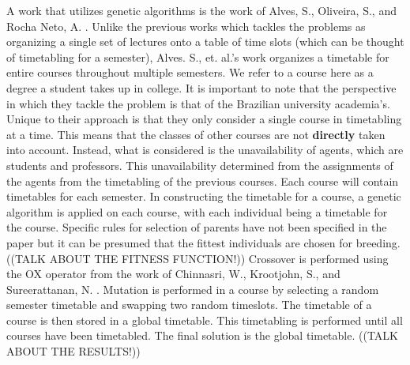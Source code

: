 A work that utilizes genetic algorithms is the work of Alves, S., Oliveira, S., and Rocha Neto, A. \cite{alves-novel-recursive}. Unlike the previous works which tackles the problems as organizing a single set of lectures onto a table of time slots (which can be thought of timetabling for a semester), Alves. S., et. al.'s work organizes a timetable for entire courses throughout multiple semesters. We refer to a course here as a degree a student takes up in college. It is important to note that the perspective in which they tackle the problem is that of the Brazilian university academia's. Unique to their approach is that they only consider a single course in timetabling at a time. This means that the classes of other courses are not \textbf{directly} taken into account. Instead, what is considered is the unavailability of agents, which are students and professors. This unavailability determined from the assignments of the agents from the timetabling of the previous courses. Each course will contain timetables for each semester. In constructing the timetable for a course, a genetic algorithm is applied on each course, with each individual being a timetable for the course. Specific rules for selection of parents have not been specified in the paper but it can be presumed that the fittest individuals are chosen for breeding. ((TALK ABOUT THE FITNESS FUNCTION!)) Crossover is performed using the OX operator from the work of Chinnasri, W., Krootjohn, S., and Sureerattanan, N. \cite{wutthipong-performance-study-genetic-operators}. Mutation is performed in a course by selecting a random semester timetable and swapping two random timeslots. The timetable of a course is then stored in a global timetable. This timetabling is performed until all courses have been timetabled. The final solution is the global timetable. ((TALK ABOUT THE RESULTS!))



